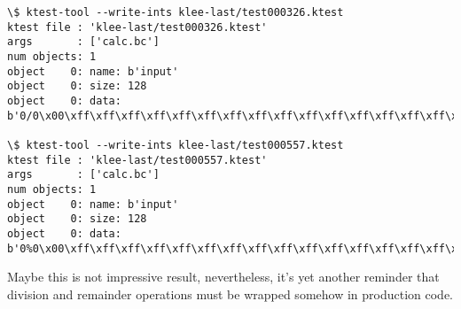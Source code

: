 \begin{lstlisting}
\$ ktest-tool --write-ints klee-last/test000326.ktest
ktest file : 'klee-last/test000326.ktest'
args       : ['calc.bc']
num objects: 1
object    0: name: b'input'
object    0: size: 128
object    0: data: b'0/0\x00\xff\xff\xff\xff\xff\xff\xff\xff\xff\xff\xff\xff\xff\xff\xff\xff\xff\xff\xff\xff\xff\xff\xff\xff\xff\xff\xff\xff\xff\xff\xff\xff\xff\xff\xff\xff\xff\xff\xff\xff\xff\xff\xff\xff\xff\xff\xff\xff\xff\xff\xff\xff\xff\xff\xff\xff\xff\xff\xff\xff\xff\xff\xff\xff\xff\xff\xff\xff\xff\xff\xff\xff\xff\xff\xff\xff\xff\xff\xff\xff\xff\xff\xff\xff\xff\xff\xff\xff\xff\xff\xff\xff\xff\xff\xff\xff\xff\xff\xff\xff\xff\xff\xff\xff\xff\xff\xff\xff\xff\xff\xff\xff\xff\xff\xff\xff\xff\xff\xff\xff\xff\xff\xff\xff'

\$ ktest-tool --write-ints klee-last/test000557.ktest
ktest file : 'klee-last/test000557.ktest'
args       : ['calc.bc']
num objects: 1
object    0: name: b'input'
object    0: size: 128
object    0: data: b'0%0\x00\xff\xff\xff\xff\xff\xff\xff\xff\xff\xff\xff\xff\xff\xff\xff\xff\xff\xff\xff\xff\xff\xff\xff\xff\xff\xff\xff\xff\xff\xff\xff\xff\xff\xff\xff\xff\xff\xff\xff\xff\xff\xff\xff\xff\xff\xff\xff\xff\xff\xff\xff\xff\xff\xff\xff\xff\xff\xff\xff\xff\xff\xff\xff\xff\xff\xff\xff\xff\xff\xff\xff\xff\xff\xff\xff\xff\xff\xff\xff\xff\xff\xff\xff\xff\xff\xff\xff\xff\xff\xff\xff\xff\xff\xff\xff\xff\xff\xff\xff\xff\xff\xff\xff\xff\xff\xff\xff\xff\xff\xff\xff\xff\xff\xff\xff\xff\xff\xff\xff\xff\xff\xff\xff\xff'
\end{lstlisting}

Maybe this is not impressive result, nevertheless, it's yet another reminder that division and remainder operations must be wrapped somehow in production code.

